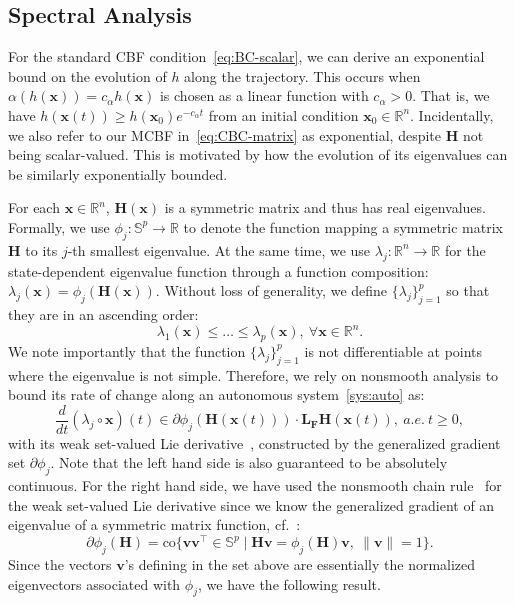 \documentclass[10pt,a4paper]{amsart}
\newcommand{\real}{\mathbb{R}}
\newcommand{\map}[3]{#1:#2 \rightarrow #3}
\newcommand{\setdefb}[2]{\big\{#1 \; | \; #2\big\}}
\theoremstyle{definition}
\newcommand{\bv}{\mathbf{v}}
\newcommand{\bx}{\mathbf{x}}
\newcommand{\bF}{\mathbf{F}}
\newcommand{\bH}{\mathbf{H}}
\newcommand{\bL}{\mathbf{L}}
\begin{document}
\subsection{Spectral Analysis}
For the standard CBF condition~\eqref{eq:BC-scalar}, we can derive an exponential bound on the evolution of $h$ along the trajectory. This occurs when $\alpha(h(\bx))= c_\alpha h(\bx)$ is chosen as a linear function with $c_\alpha >0$. That is, we have $h(\bx(t))\geq h(\bx_0)e^{-c_\alpha t}$ from an initial condition $\bx_0\in\real^n$. Incidentally, we also refer to our MCBF in~\eqref{eq:CBC-matrix} as exponential, despite $\bH$ not being scalar-valued. This is motivated by how the evolution of its eigenvalues can be similarly exponentially bounded.

For each $\bx\in\real^n$, $\bH(\bx)$ is a symmetric matrix and thus has real eigenvalues. Formally, we use $\map{\phi_j}{\mathbb S^p}{\real}$ to denote the function mapping a symmetric matrix $\bH$ to its $j$-th smallest eigenvalue. At the same time, we use $\map{\lambda_j}{\real^n}{\real}$ for the state-dependent eigenvalue function through a function composition: $\lambda_j(\bx)=\phi_j(\bH(\bx))$. Without loss of generality, we define $\{\lambda_j\}_{j=1}^p$ so that they are in an ascending order:
\begin{equation}
    \lambda_1(\bx)\leq \dots \leq \lambda_p(\bx),~\forall \bx\in\real^n.
\end{equation}
We note importantly that the function $\{\lambda_j\}_{j=1}^p$ is not differentiable at points where the eigenvalue  is not simple. Therefore, we rely on nonsmooth analysis to bound its rate of change along an autonomous system~\eqref{sys:auto} as:
$$
    \frac{d}{dt}(\lambda_j\circ \bx)(t) \in \partial \phi_j (\bH(\bx(t))) \cdot \bL_\bF\bH(\bx(t)),  ~a.e.~t\geq0,
$$
with its weak set-valued Lie derivative~\cite[Lem. 1 and Rmk. 1]{PG-JC-ME:17}, constructed by the generalized gradient set $\partial\phi_j$. Note that the left hand side is also guaranteed to be absolutely continuous. For the right hand side, we have used the nonsmooth chain rule~\cite[Thm. 2.3.10]{FHC:83} for the weak set-valued Lie derivative since we know the generalized gradient of an eigenvalue of a symmetric matrix function, cf.~\cite{MDS-JC:09}:
$$
    \partial\phi_j(\bH) = \text{co}\setdefb{\bv\bv^\top \in \mathbb{S}^p}{\bH\bv=\phi_j(\bH)\bv,~\|\bv\| = 1}.
$$
Since the vectors $\bv$'s defining in the set above are essentially the normalized eigenvectors associated with $\phi_j$, we have the following result. 
\end{document}
